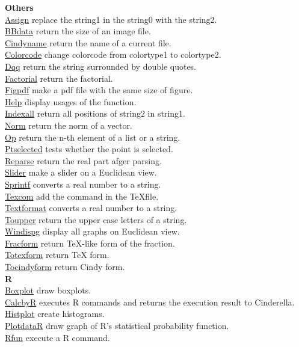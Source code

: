 \documentclass[papersize,a4paper,12pt]{article}
\begin{document}
\begin{tabbing}
{\bf Others} \> \\
\hyperlink{assign}{Assign} \> replace the string1 in the string0 with the string2.\\
\hyperlink{bbdata}{BBdata} \> return the size of an image file.\\
\hyperlink{cindyname}{Cindyname} \> return the name of a current file.\\
\hyperlink{colorcode}{Colorcode} \> change colorcode from colortype1 to colortype2.\\
\hyperlink{dqq}{Dqq} \> return the string surrounded by double quotes.\\
\hyperlink{factorial}{Factorial} \> return the factorial.\\
\hyperlink{figpdf}{Figpdf} \> make a pdf file with the same size of figure.\\
\hyperlink{help}{Help} \> display usages of the function.\\
\hyperlink{indexall}{Indexall} \>return all positions of string2 in string1.\\
\hyperlink{norml}{Norm} \> return the norm of a vector.\\
\hyperlink{opl}{Op} \> return the n-th element of a list or a string.\\
\hyperlink{ptselected}{Ptselected} \> tests whether the point is selected.\\
\hyperlink{reparse}{Reparse} \> return the real part afger parsing.\\
\hyperlink{slider}{Slider} \> make a slider on a Euclidean view.\\
\hyperlink{sprintf}{Sprintf} \> converts a real number to a string.\\
\hyperlink{texcom}{Texcom} \> add the command in the \TeX file.\\
\hyperlink{textformat}{Textformat} \> converts a real number to a string.\\
\hyperlink{toupper}{Toupper} \> return the upper case letters of a string.\\
\hyperlink{windispg}{Windispg} \> display all graphs on Euclidean view.\\
\hyperlink{fracform}{Fracform} \>return TeX-like form of the fraction.\\
\hyperlink{totexform}{Totexform} \> return TeX form.\\
\hyperlink{tocindyform}{Tocindyform} \> return Cindy form.\\

{\bf R} \> \\
\hyperlink{boxplot}{Boxplot} \> draw boxplots.\\
\hyperlink{calcbyr}{CalcbyR} \> executes R commands and returns the execution result to Cinderella.\\
\hyperlink{histplot}{Histplot} \> create histograms.\\
\hyperlink{plotdatar}{PlotdataR} \>draw graph of R's statistical probability function.\\
\hyperlink{rfun}{Rfun} \>execute a R command.\\


\end{tabbing}
\end{document}
